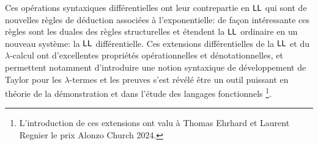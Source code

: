 \documentclass[a4]{article}
\begin{document}
Ces opérations syntaxiques différentielles ont leur contrepartie en
$\hbox{\textsf{LL}}$ qui sont de nouvelles règles de déduction associées à
l'exponentielle: de façon intéressante ces règles sont les duales des
règles structurelles et étendent la $\hbox{\textsf{LL}}$ ordinaire en un nouveau
système: la $\hbox{\textsf{LL}}$ différentielle.
%
Ces extensions différentielles de la $\hbox{\textsf{LL}}$ et du $\lambda$-calcul ont
d'excellentes propriétés opérationnelles et dénotationnelles, et
permettent notamment d'introduire une notion syntaxique de
développement de Taylor pour les $\lambda$-termes et les preuves s'est
révélé être un outil puissant en théorie de la démonstration et dans
l'étude des langages fonctionnels%
\footnote{L'introduction de ces
  extensions ont valu à Thomas Ehrhard et Laurent Regnier le prix
  Alonzo Church 2024.}.



\end{document}
